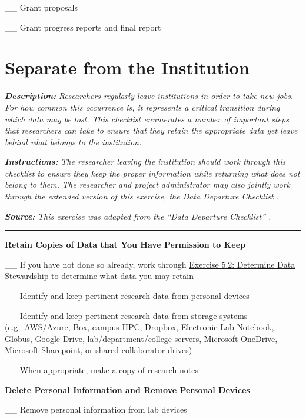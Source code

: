 \documentclass[
]{book}
\begin{document}
\_\_ Grant proposals

\_\_ Grant progress reports and final report

\newpage

\hypertarget{separation}{%
\section{Separate from the Institution}\label{separation}}

\textbf{\emph{Description:}} \emph{Researchers regularly leave institutions in order to take new jobs. For how common this occurrence is, it represents a critical transition during which data may be lost. This checklist enumerates a number of important steps that researchers can take to ensure that they retain the appropriate data yet leave behind what belongs to the institution.}

\textbf{\emph{Instructions:}} \emph{The researcher leaving the institution should work through this checklist to ensure they keep the proper information while returning what does not belong to them. The researcher and project administrator may also jointly work through the extended version of this exercise, the Data Departure Checklist \citep{goben_data_2023}.}

\textbf{\emph{Source:}} \emph{This exercise was adapted from the ``Data Departure Checklist'' \citep{goben_data_2023}.}

\begin{center}\rule{0.5\linewidth}{0.5pt}\end{center}

\textbf{Retain Copies of Data that You Have Permission to Keep}

\_\_ If you have not done so already, work through \protect\hyperlink{data-governance}{Exercise 5.2: Determine Data Stewardship} to determine what data you may retain

\_\_ Identify and keep pertinent research data from personal devices

\_\_ Identify and keep pertinent research data from storage systems (e.g.~AWS/Azure, Box, campus HPC, Dropbox, Electronic Lab Notebook, Globus, Google Drive, lab/department/college servers, Microsoft OneDrive, Microsoft Sharepoint, or shared collaborator drives)

\_\_ When appropriate, make a copy of research notes

\textbf{Delete Personal Information and Remove Personal Devices}

\_\_ Remove personal information from lab devices
\end{document}
